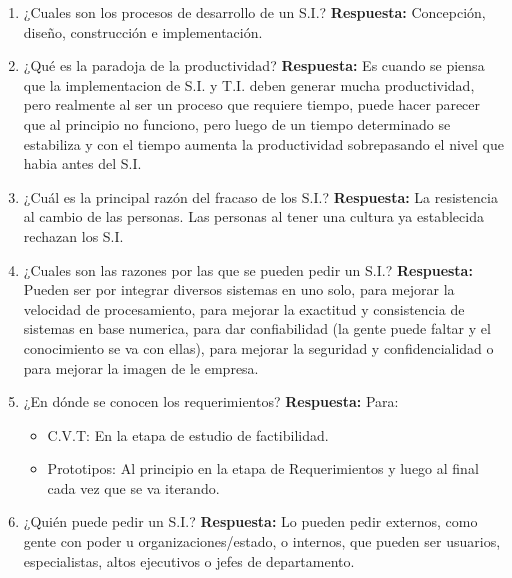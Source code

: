 \documentclass{templateNote}
\begin{document}
\begin{enumerate}
    \item ¿Cuales son los procesos de desarrollo de un S.I.?\newline
    \textbf{Respuesta:} Concepción, diseño, construcción e implementación.

    \item ¿Qué es la paradoja de la productividad?\newline
    \textbf{Respuesta:} Es cuando se piensa que la implementacion de S.I. y T.I. deben generar mucha productividad, pero realmente al ser un proceso que requiere tiempo, puede hacer parecer que al principio no funciono, pero luego de un tiempo determinado se estabiliza y con el tiempo aumenta la productividad sobrepasando el nivel que habia antes del S.I.

    \item ¿Cuál es la principal razón del fracaso de los S.I.?\newline
    \textbf{Respuesta:} La resistencia al cambio de las personas. Las personas al tener una cultura ya establecida rechazan los S.I.

    \newpage
    \item ¿Cuales son las razones por las que se pueden pedir un S.I.?\newline
    \textbf{Respuesta:} Pueden ser por integrar diversos sistemas en uno solo, para mejorar la velocidad de procesamiento, para mejorar la exactitud y consistencia de sistemas en base numerica, para dar confiabilidad (la gente puede faltar y el conocimiento se va con ellas), para mejorar la seguridad y confidencialidad o para mejorar la imagen de le empresa.

    \item ¿En dónde se conocen los requerimientos?\newline
    \textbf{Respuesta:} Para:
    \begin{itemize}
        \item C.V.T: En la etapa de estudio de factibilidad.
        \item Prototipos: Al principio en la etapa de Requerimientos y luego al final cada vez que se va iterando.
    \end{itemize}

    \item ¿Quién puede pedir un S.I.?\newline
    \textbf{Respuesta:} Lo pueden pedir externos, como gente con poder u organizaciones/estado, o internos, que pueden ser usuarios, especialistas, altos ejecutivos o jefes de departamento.


\end{enumerate}
\end{document}
